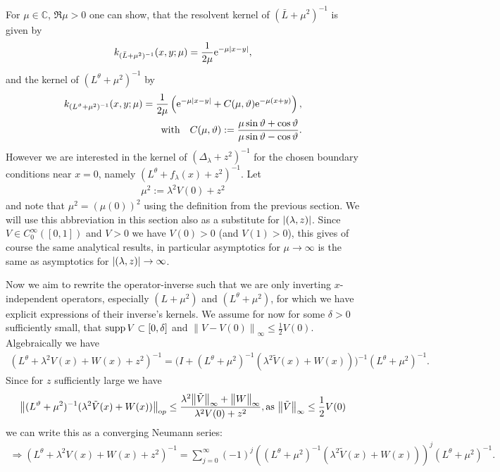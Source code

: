 For $\mu\in\mathbb{C}$, $\Re\mu > 0$ one can show, that the resolvent kernel of
$(\bar L + \mu^2)^{-1}$ is given by
\begin{align}
  k_{(\bar L + \mu^2)^{-1}}(x,y;\mu) = \frac1{2\mu}\mathrm e^{-\mu\left|x-y\right|},
\end{align}
and the kernel of $(L^\theta+\mu^2)^{-1}$ by
\begin{align}
  \label{frm:k-l-theta}
  k_{(L^\vartheta +\mu^2)^{-1}}(x,y;\mu) = \frac1{2\mu} \left( \mathrm e^{-\mu\left|x-y\right|} +
  C(\mu,\vartheta)\mathrm e^{-\mu(x+y)}\right), \\
  \label{frm:c-mu-theta}
  \text{with} \quad C(\mu,\vartheta) :=
  \frac{\mu\sin\vartheta+\cos\vartheta}{\mu\sin\vartheta-\cos\vartheta}.
\end{align}
However we are interested in the kernel of $(\Delta_\lambda + z^2)^{-1}$ for the
chosen boundary conditions near $x = 0$, namely $(L^\theta + f_\lambda(x) +
z^2)^{-1}$. Let
\begin{align*}
  \mu^2 := \lambda^2 V(0) + z^2
\end{align*}
and note that $\mu^2 = (\mu(0))^2$ using the definition from the previous
section. We will use this abbreviation in this section also as a substitute for
$\left|(\lambda,z)\right|$. Since $V\in C_0^\infty([0,1])$ and $V > 0$ we have $V(0) >
0$ (and $V(1) > 0$), this gives of course the same analytical results, in
particular asymptotics for $\mu\to\infty$ is the same as asymptotics for
$\left|(\lambda,z)\right|\to\infty$.

Now we aim to rewrite the operator-inverse such that we are only inverting
$x$-independent operators, especially $(L+\mu^2)$ and $(L^\theta+\mu^2)$, for
which we have explicit expressions of their inverse's kernels. We assume for now
for some $\delta > 0$ sufficiently small, that $\operatorname{supp} V \subset [0,\delta]$ and
$\left\|V-V(0)\right\|_{\infty}\leq \frac12V(0)$. Algebraically we have
\begin{align*}
  (L^\theta + \lambda^2 V(x) + W(x) + z^2)^{-1} =
    \bigl(I + (L^\theta + \mu^2)^{-1}(\lambda^2\tilde V(x) + W(x))\bigr)^{-1}
    (L^\theta + \mu^2)^{-1}.
\end{align*}
Since for $z$ sufficiently large we have
\begin{align*}
  \bigl\|(L^\vartheta + \mu^2)^{-1}(\lambda^2\tilde V(x) + W(x))\bigr\|_{\mathrm op} \leq
  \frac{\lambda^2\bigl\|\tilde V\bigr\|_{\infty} + \bigl\|W\bigr\|_{\infty}}{\lambda^2 V(0) + z^2},
  \text{as } \bigl\|\tilde V\bigr\|_{\infty} \leq \frac12V(0)
\end{align*}
we can write this as a converging Neumann series:
\begin{align}
  \label{frm:neumann-sum}
  \Rightarrow (L^\theta + \lambda^2 V(x) + W(x) + z^2)^{-1} =
    \sum_{j=0}^\infty (-1)^j \left((L^\theta + \mu^2)^{-1}(\lambda^2\tilde V(x)
    + W(x))\right)^j (L^\theta + \mu^2)^{-1}.
\end{align}

